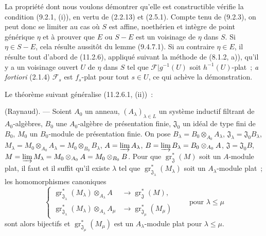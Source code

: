 La propriété dont nous voulons démontrer qu'elle est constructible vérifie la
condition (9.2.1, (i)), en vertu de (2.2.13) et (2.5.1). Compte tenu de
(9.2.3), on peut donc se limiter au cas où $S$ est affine, noethérien et
intègre de point générique $\eta$ et à prouver que $E$ ou $S-E$ est un
voisinage de $\eta$ dans $S$. Si $\eta\in S-E$, cela résulte aussitôt du
lemme (9.4.7.1). Si au contraire $\eta\in E$, il résulte tout d'abord de
(11.2.6), appliqué suivant la méthode de (8.1.2, a)), qu'il y a un voisinage
ouvert $U$ de $\eta$ dans $S$ tel que
$\mathcal F|g^{-1}(U)$ soit $h^{-1}(U)$-plat~; \emph{a fortiori} (2.1.4)
$\mathcal F_s$ est $f_s$-plat pour tout $s\in U$, ce qui achève la
démonstration.

Le théorème suivant généralise (11.2.6.1, (ii))~:

\begin{theorem}[11.2.9]
(Raynaud). --- Soient $A_0$ un anneau, $(A_\lambda)_{\lambda\in L}$ un système
inductif filtrant de $A_0$-algèbres, $B_0$ une $A_0$-algèbre de présentation
finie, $\mathfrak J_0$ un idéal de type fini de $B_0$, $M_0$ un $B_0$-module
de présentation finie. On pose
$B_\lambda=B_0\otimes_{A_0}A_\lambda$,
$\mathfrak J_\lambda=\mathfrak J_0B_\lambda$,
$M_\lambda=M_0\otimes_{A_0}A_\lambda=M_0\otimes_{B_0}B_\lambda$,
$A=\varinjlim A_\lambda$,
$B=\varinjlim B_\lambda=B_0\otimes_{A_0}A$,
$\mathfrak J=\mathfrak J_0B$,
$M=\varinjlim M_\lambda=M_0\otimes_{A_0}A=M_0\otimes_{B_0}B$. Pour que
$\operatorname{gr}_{\mathfrak J}^*(M)$ soit un $A$-module plat, il faut et il
suffit qu'il existe $\lambda$ tel que
$\operatorname{gr}_{\mathfrak J_\lambda}^*(M_\lambda)$ soit un
$A_\lambda$-module plat~; les homomorphismes canoniques
\begin{equation}
\left\{
\begin{aligned}
\operatorname{gr}_{\mathfrak J_\lambda}^*(M_\lambda)
  \otimes_{A_\lambda}A&\longrightarrow
  \operatorname{gr}_{\mathfrak J}^*(M),\\
\operatorname{gr}_{\mathfrak J_\lambda}^*(M_\lambda)
  \otimes_{A_\lambda}A_\mu&\longrightarrow
  \operatorname{gr}_{\mathfrak J_\mu}^*(M_\mu)
\end{aligned}
\right.
\qquad\text{pour }\lambda\leq\mu
\label{IV.11.2.9.1-fr}
\tag{11.2.9.1}
\end{equation}
sont alors bijectifs et
$\operatorname{gr}_{\mathfrak J_\mu}^*(M_\mu)$ est un $A_\lambda$-module plat
pour $\lambda\leq\mu$.
\end{theorem}

